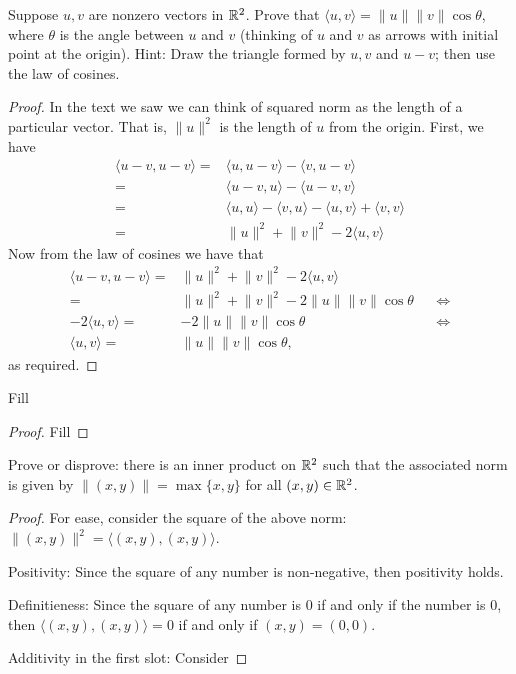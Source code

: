 \begin{exercise}{13}
  Suppose $u,v$ are nonzero vectors in $\mathbb{R}^2$. Prove that $\langle u,v\rangle= \lVert u\rVert\lVert v\rVert\cos\theta$, where $\theta$ is the angle between $u$ and $v$ (thinking of $u$ and $v$ as arrows with initial point at the origin). Hint: Draw the triangle formed by $u,v$ and $u-v$; then use the law of cosines.
\end{exercise}
\begin{proof}
 In the text we saw we can think of squared norm as the length of a particular vector. That is, $\lVert u\rVert^2$ is the length of $u$ from the origin. First, we have
 \begin{align*}
     \langle u-v, u-v\rangle =& \langle u, u-v\rangle-\langle v,u-v\rangle\\
     =& \langle u-v,u\rangle-\langle u-v,v\rangle\\
     =& \langle u,u\rangle-\langle v,u\rangle-\langle u,v\rangle +\langle v,v\rangle\\
     =& \lVert u\rVert^2+\lVert v\rVert^2-2\langle u,v\rangle
 \end{align*}
 Now from the law of cosines we have that
 \begin{align*}
     \langle u-v,u-v\rangle =& \lVert u\rVert^2+\lVert v\rVert^2-2\langle u,v\rangle\\
     =& \lVert u\rVert^2 +\lVert v\rVert^2 -2\lVert u\rVert\lVert v\rVert\cos\theta &&\iff\\
     -2\langle u,v\rangle =& -2\lVert u\rVert\lVert v\rVert\cos\theta &&\iff\\
     \langle u,v\rangle =& \lVert u\rVert\lVert v\rVert\cos\theta,
 \end{align*}
 as required.
\end{proof}

\begin{exercise}{14}
  Fill
\end{exercise}
\begin{proof}
 Fill
\end{proof}

\begin{exercise}{17}
  Prove or disprove: there is an inner product on $\mathbb{R}^2$ such that the associated norm is given by $\lVert (x,y)\rVert=\max\{x,y\}$ for all $(x,y)\in\mathbb{R}^2$.
\end{exercise}
\begin{proof}
 For ease, consider the square of the above norm: $\lVert (x,y)\rVert^2=\langle (x,y),(x,y)\rangle$.

 Positivity: Since the square of any number is non-negative, then positivity holds. 

 Definitieness: Since the square of any number is 0 if and only if the number is 0, then $\langle (x,y),(x,y)\rangle=0$ if and only if $(x,y)=(0,0)$.

 Additivity in the first slot: Consider 
\end{proof}

